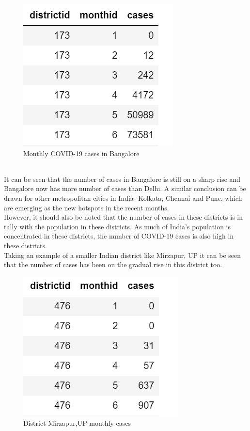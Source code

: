 \documentclass{article}
\begin{document}
\begin{figure}[htbp]
\centerline{\includegraphics{bangalore.png}}
\caption{Monthly COVID-19 cases in Bangalore}
\label{fig}
\end{figure} \\
It can be seen that the number of cases in Bangalore is still on a sharp rise and Bangalore now has more number of cases than Delhi. A similar conclusion can be drawn for other metropolitan cities in India- Kolkata, Chennai and Pune, which are emerging as the new hotspots in the recent months. \\
However, it should also be noted that the number of cases in these districts is in tally with the population in these districts. As much of India's population is concentrated in these districts, the number of COVID-19 cases is also high in these districts.\\
Taking an example of a smaller Indian district like Mirzapur, UP it can be seen that the number of cases has been on the gradual rise in this district too.\\
\begin{figure}[h]
\centerline{\includegraphics{mirzapurmonthly.png}}
\caption{District Mirzapur,UP-monthly cases}
\label{fig}
\end{figure} \\
\end{document}
